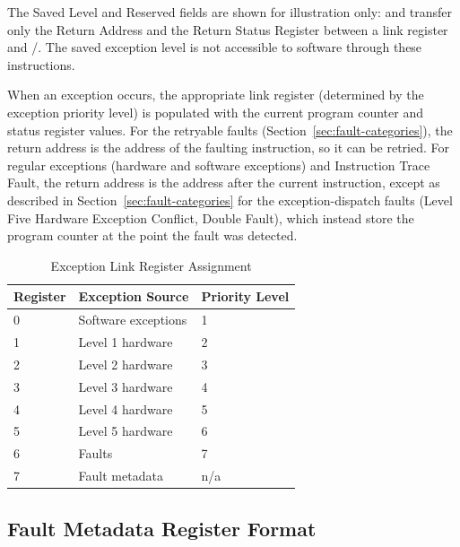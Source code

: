 The Saved Level and Reserved fields are shown for illustration only:  and  transfer only
the Return Address and the Return Status Register between a link register and /. The saved exception
level is not accessible to software through these instructions.

When an exception occurs, the appropriate link register (determined by the exception priority level) is populated with
the current program counter and status register values. For the retryable faults (Section~\ref{sec:fault-categories}),
the return address is the address of the faulting instruction, so it can be retried. For regular exceptions (hardware
and software exceptions) and Instruction Trace Fault, the return address is the address after the current instruction,
except as described in Section~\ref{sec:fault-categories} for the exception-dispatch faults (Level Five Hardware
Exception Conflict, Double Fault), which instead store the program counter at the point the fault was detected.

\begin{table}[H]
	\centering
	\begin{tabular}{lll}
		\toprule
		\textbf{Register} & \textbf{Exception Source} & \textbf{Priority Level} \\
		\midrule
		0                 & Software exceptions       & 1                       \\
		1                 & Level 1 hardware          & 2                       \\
		2                 & Level 2 hardware          & 3                       \\
		3                 & Level 3 hardware          & 4                       \\
		4                 & Level 4 hardware          & 5                       \\
		5                 & Level 5 hardware          & 6                       \\
		6                 & Faults                    & 7                       \\
		7                 & Fault metadata            & n/a                     \\
		\bottomrule
	\end{tabular}
	\caption{Exception Link Register Assignment}
	\label{tab:exception-link-register-assignment}
\end{table}

\subsection{Fault Metadata Register Format}
\label{sec:fault-metadata-register-format}

